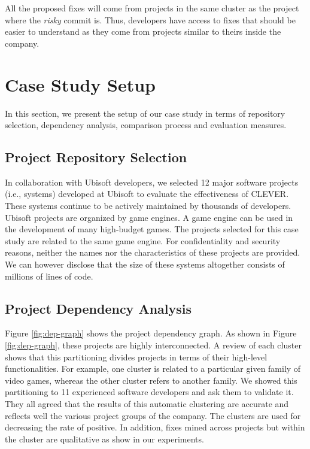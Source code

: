 \documentclass[sigconf]{acmart}
\begin{document}
All the proposed fixes will come from projects in the same cluster as
the project where the \emph{risky} commit is. Thus, developers have
access to fixes that should be easier to understand as they come from
projects similar to theirs inside the company.

\section{Case Study Setup}\label{sec:exp}

In this section, we present the setup of our case study in terms of
repository selection, dependency analysis, comparison process and
evaluation measures.

\subsection{Project Repository Selection}\label{sec:rep}

In collaboration with Ubisoft developers, we selected 12 major software
projects (i.e., systems) developed at Ubisoft to evaluate the
effectiveness of CLEVER. These systems continue to be actively
maintained by thousands of developers. Ubisoft projects are organized by
game engines. A game engine can be used in the development of many
high-budget games. The projects selected for this case study are related
to the same game engine. For confidentiality and security reasons,
neither the names nor the characteristics of these projects are
provided. We can however disclose that the size of these systems
altogether consists of millions of lines of code.

\subsection{Project Dependency Analysis}\label{sec:dependencies}

Figure \ref{fig:dep-graph} shows the project dependency graph. As shown
in Figure \ref{fig:dep-graph}, these projects are highly interconnected.
A review of each cluster shows that this partitioning divides projects
in terms of their high-level functionalities. For example, one cluster
is related to a particular given family of video games, whereas the
other cluster refers to another family. We showed this partitioning to
11 experienced software developers and ask them to validate it. They all
agreed that the results of this automatic clustering are accurate and
reflects well the various project groups of the company. The clusters
are used for decreasing the rate of positive. In addition, fixes mined
across projects but within the cluster are qualitative as show in our
experiments.
\end{document}
